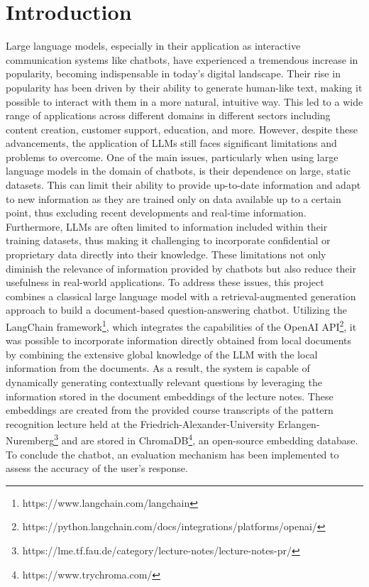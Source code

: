 \documentclass{article}
\begin{document}
\section{Introduction}
Large language models, especially in their application as interactive communication systems like chatbots, have experienced a tremendous increase in popularity, becoming indispensable in today's digital landscape. Their rise in popularity has been driven by their ability to generate human-like text, making it possible to interact with them in a more natural, intuitive way. This led to a wide range of applications across different domains in different sectors including content creation, customer support, education, and more. However, despite these advancements, the application of LLMs still faces significant limitations and problems to overcome.
\newline
One of the main issues, particularly when using large language models in the domain of chatbots, is their dependence on large, static datasets. This can limit their ability to provide up-to-date information and adapt to new information as they are trained only on data available up to a certain point, thus excluding recent developments and real-time information. Furthermore, LLMs are often limited to information included within their training datasets, thus making it challenging to incorporate confidential or proprietary data directly into their knowledge. These limitations not only diminish the relevance of information provided by chatbots but also reduce their usefulness in real-world applications.
\newline
To address these issues, this project combines a classical large language model with a retrieval-augmented generation approach to build a document-based question-answering chatbot. Utilizing the LangChain framework\footnote{https://www.langchain.com/langchain}, which integrates the capabilities of the \mbox{OpenAI} API\footnote{https://python.langchain.com/docs/integrations/platforms/openai/}, it was possible to incorporate information directly obtained from local documents by combining the extensive global knowledge of the LLM with the local information from the documents. As a result, the system is capable of dynamically generating contextually relevant questions by leveraging the information stored in the document embeddings of the lecture notes. These embeddings are created from the provided course transcripts of the pattern recognition lecture held at the Friedrich-Alexander-University Erlangen-Nuremberg\footnote{https://lme.tf.fau.de/category/lecture-notes/lecture-notes-pr/} and are stored in \mbox{ChromaDB}\footnote{https://www.trychroma.com/}, an open-source embedding database. To conclude the chatbot, an evaluation mechanism has been implemented to assess the accuracy of the user's response.
\end{document}

